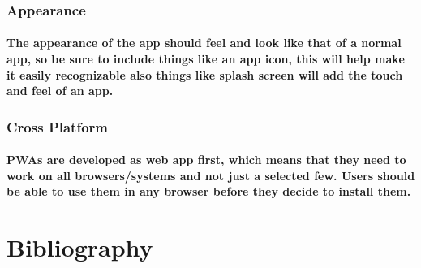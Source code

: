 \documentclass[12pt,a4paper]{article}
\begin{document}
    \subsubsection{Appearance}

    \paragraph{The appearance of the app should feel and look like that of a normal app, so be sure to include things like an app icon, this will help make it easily recognizable also things like splash screen will add the touch and feel of an app.
}

    \subsubsection{Cross Platform}

    \paragraph{PWAs are developed as web app first, which means that they need to work on all browsers/systems and not just a selected few. Users should be able to use them in any browser before they decide to install them.
}

\clearpage

	\section{Bibliography}
\end{document}
